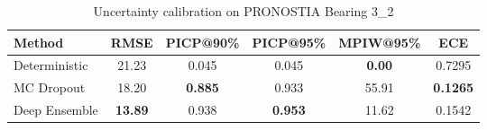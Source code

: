 \begin{table}[h]
\centering
\caption{Uncertainty calibration on PRONOSTIA Bearing 3\_2}
\label{tab:uncertainty}
\begin{tabular}{lccccc}
\toprule
Method & RMSE & PICP@90\% & PICP@95\% & MPIW@95\% & ECE \\
\midrule
Deterministic & 21.23 & 0.045 & 0.045 & \textbf{0.00} & 0.7295 \\
MC Dropout & 18.20 & \textbf{0.885} & 0.933 & 55.91 & \textbf{0.1265} \\
Deep Ensemble & \textbf{13.89} & 0.938 & \textbf{0.953} & 11.62 & 0.1542 \\
\bottomrule
\end{tabular}
\end{table}
